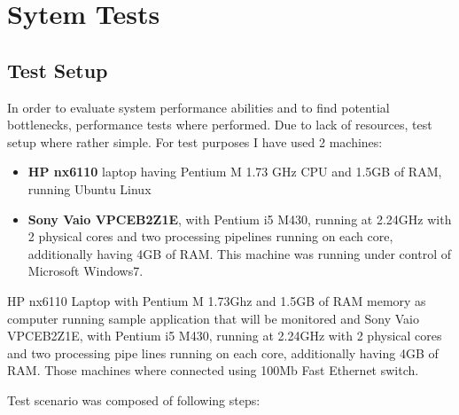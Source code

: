 %


\section{Sytem Tests}
\label{sec:ch7_tests}

\subsection{Test Setup}

In order to evaluate system performance abilities and to find potential bottlenecks, performance tests where performed. Due to lack of resources, test setup where rather simple. For test purposes I have used 2 machines: 
\begin{itemize}
\item {\bf HP nx6110} laptop having Pentium M 1.73 GHz CPU and 1.5GB of RAM, running Ubuntu Linux
\item {\bf Sony Vaio VPCEB2Z1E}, with Pentium i5 M430, running at 2.24GHz with 2 physical cores and two processing pipelines running on each core, additionally having 4GB of RAM. This machine was running under control of Microsoft Windows7.
\end{itemize}
HP nx6110 Laptop with Pentium M 1.73Ghz and 1.5GB of RAM memory as computer running sample application that will be monitored and Sony Vaio VPCEB2Z1E, with Pentium i5 M430, running at 2.24GHz with 2 physical cores and two processing pipe lines running on each core, additionally having 4GB of RAM. Those machines where connected using 100Mb Fast Ethernet switch.

Test scenario was composed of following steps:

